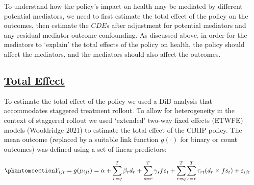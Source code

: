 \documentclass[
  letterpaper,
  DIV=11,
  numbers=noendperiod]{scrartcl}
\providecommand{\DIFadd}[1]{{\protect\color{blue}\underline{#1}}} %
\providecommand{\DIFaddbegin}{} %
\providecommand{\DIFaddend}{} %
\providecommand{\DIFdelbegin}{} %
\providecommand{\DIFdelend}{} %
\newcommand{\DIFscaledelfig}{0.5}
\newlength{\DIFdelgraphicswidth} %
\newlength{\DIFdelgraphicsheight} %
\newcommand{\DIFaddincludegraphics}[2][]{{\color{blue}\fbox{\DIFOincludegraphics[#1]{#2}}}} %
\newcommand{\DIFdelincludegraphics}[2][]{%
\sbox{\DIFdelgraphicsbox}{\DIFOincludegraphics[#1]{#2}}%
\settoboxwidth{\DIFdelgraphicswidth}{\DIFdelgraphicsbox} %
\settoboxtotalheight{\DIFdelgraphicsheight}{\DIFdelgraphicsbox} %
\scalebox{\DIFscaledelfig}{%
\parbox[b]{\DIFdelgraphicswidth}{\usebox{\DIFdelgraphicsbox}\\[-\baselineskip] \rule{\DIFdelgraphicswidth}{0em}}\llap{\resizebox{\DIFdelgraphicswidth}{\DIFdelgraphicsheight}{%
\setlength{\unitlength}{\DIFdelgraphicswidth}%
\begin{picture}(1,1)%
\thicklines\linethickness{2pt} %
{\color[rgb]{1,0,0}\put(0,0){\framebox(1,1){}}}%
{\color[rgb]{1,0,0}\put(0,0){\line( 1,1){1}}}%
{\color[rgb]{1,0,0}\put(0,1){\line(1,-1){1}}}%
\end{picture}%
}\hspace*{3pt}}} %
} %
\DeclareRobustCommand{\DIFaddbegin}{\DIFOaddbegin \let\includegraphics\DIFaddincludegraphics} %
\DeclareRobustCommand{\DIFaddend}{\DIFOaddend \let\includegraphics\DIFOincludegraphics} %
\DeclareRobustCommand{\DIFdelbegin}{\DIFOdelbegin \let\includegraphics\DIFdelincludegraphics} %
\DeclareRobustCommand{\DIFdelend}{\DIFOaddend \let\includegraphics\DIFOincludegraphics} %
\begin{document}
To understand how the policy's impact on health may be mediated by
different potential mediators, we need to first estimate the total
effect of the policy on the outcomes, then estimate the \(CDE\)s after
adjustment for potential mediators and any residual mediator-outcome
confounding. As discussed above, in order for the mediators to `explain'
the total effects of the policy on health, the policy should affect the
mediators, and the mediators should also affect the outcomes.

\DIFdelbegin %
\DIFdelend \DIFaddbegin \subsection{\DIFadd{Total Effect}}\label{total-effect}
\DIFaddend 

To estimate the total effect of the policy we used a DiD analysis that
accommodates staggered treatment rollout. To allow for heterogeneity in
the context of staggered rollout we used `extended' two-way fixed
effects (ETWFE) models (Wooldridge 2021) to estimate the total effect of
the CBHP policy. The mean outcome (replaced by a suitable link function
\(g(\cdot)\) for binary or count outcomes) was defined using a set of
linear predictors:

\begin{equation}\DIFdelbegin %
\DIFdelend \DIFaddbegin \phantomsection\label{eq-etwfe}{Y_{ijt}=g(\mu_{ijt}) = \alpha + \sum_{r=q}^{T} \beta_{r} d_{r} + \sum_{s=r}^{T} \gamma_{s} fs_{t}+ \sum_{r=q}^{T} \sum_{s=r}^{T} \tau_{rt} (d_{r} \times fs_{t}) + \varepsilon_{ijt}}\DIFaddend \end{equation}
\end{document}
